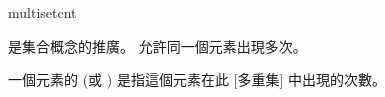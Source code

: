 \begin{modnl}[creators=Jinbo]{multiset}{cnt}
	\begin{definition}[id=multiset.def]
		 是集合概念的推廣。 允許同一個元素出現多次。
	\end{definition}

	\begin{definition}
		一個元素的  (或 ) 是指這個元素在此  中出現的次數。
	\end{definition}
\end{modnl}
